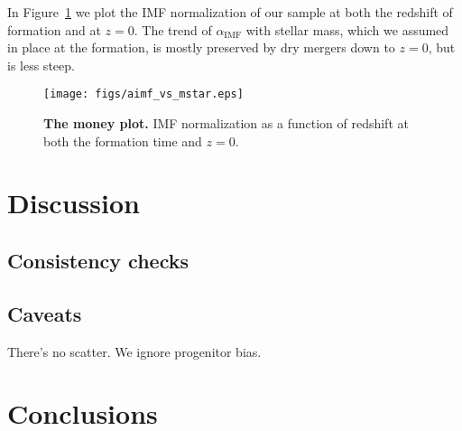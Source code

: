 \documentclass{emulateapj}
\def\aimf{\alpha_{\mathrm{IMF}}}
\def\Fref#1{Figure~\ref{#1}\xspace}
\begin{document}
In \Fref{fig:aimfm} we plot the IMF normalization of our sample at both the redshift of formation and at $z=0$.
The trend of $\aimf$ with stellar mass, which we assumed in place at the formation, is mostly preserved by dry mergers down to $z=0$, but is less steep.


\begin{figure}
\texttt{[image: figs/aimf\_vs\_mstar.eps]}
\caption{\label{fig:aimfm} 
 {\bf The money plot.} IMF normalization as a function of redshift at both the formation time and $z=0$.}
\end{figure}



\section{Discussion}\label{sect:discuss} 

\subsection{Consistency checks}

\subsection{Caveats}
There's no scatter.
We ignore progenitor bias.


\section{Conclusions}\label{sect:concl} 

\acknowledgments


%




\end{document}
